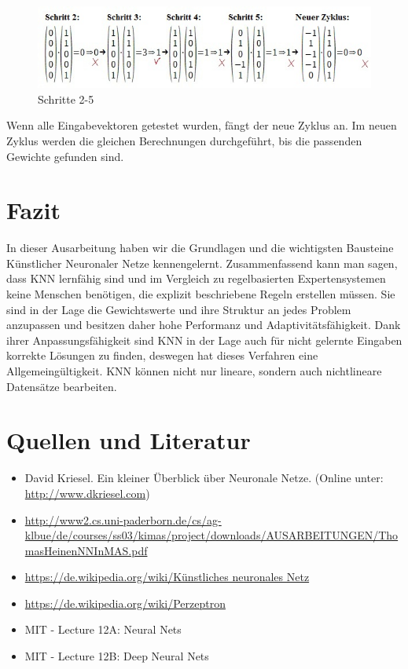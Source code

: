 \begin{figure}[h]
\centering
\includegraphics[width=12cm]{chapters/neural_networks/schritte.jpg}

\caption{Schritte 2-5}
\label{perceptronlearningsteps}

\end{figure}

Wenn alle Eingabevektoren getestet wurden, fängt der neue Zyklus an. Im neuen Zyklus werden die gleichen Berechnungen durchgeführt, bis die passenden Gewichte gefunden sind.


\section{Fazit}

In dieser Ausarbeitung haben wir die Grundlagen und die wichtigsten Bausteine Künstlicher Neuronaler Netze kennengelernt. Zusammenfassend kann man sagen, dass KNN lernfähig sind und im Vergleich zu regelbasierten Expertensystemen keine Menschen  benötigen, die explizit beschriebene Regeln erstellen müssen. Sie sind in der Lage die Gewichtswerte und ihre Struktur an jedes Problem anzupassen und besitzen daher hohe Performanz und Adaptivitätsfähigkeit. Dank ihrer Anpassungsfähigkeit sind KNN in der Lage auch für nicht gelernte Eingaben korrekte Lösungen zu finden, deswegen hat dieses Verfahren eine Allgemeingültigkeit. KNN können nicht nur lineare, sondern auch nichtlineare Datensätze bearbeiten.

\section{Quellen und Literatur}
\begin{itemize}
\item David Kriesel. Ein kleiner Überblick über Neuronale Netze. (Online unter: \url{http://www.dkriesel.com})
\item \url{http://www2.cs.uni-paderborn.de/cs/ag-klbue/de/courses/ss03/kimas/project/downloads/AUSARBEITUNGEN/ThomasHeinenNNInMAS.pdf}
\item \url{https://de.wikipedia.org/wiki/Künstliches neuronales Netz}
\item \url{https://de.wikipedia.org/wiki/Perzeptron}
\item MIT - Lecture 12A: Neural Nets
\item MIT - Lecture 12B: Deep Neural Nets
\end{itemize}
